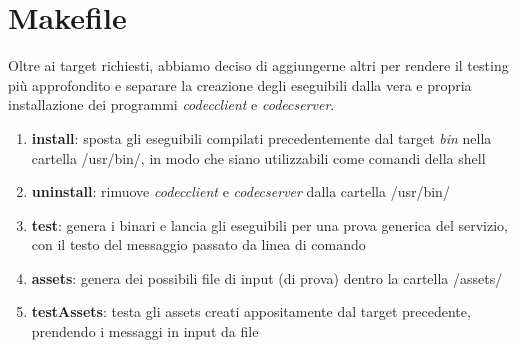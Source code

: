 \documentclass[a4paper,9pt]{article}
\begin{document}
\section{Makefile}
Oltre ai target richiesti, abbiamo deciso di aggiungerne altri per rendere il testing più approfondito e separare la creazione degli eseguibili dalla vera e propria installazione dei programmi \emph{codecclient} e \emph{codecserver}.
\begin{enumerate}
\item \textbf{install}: sposta gli eseguibili compilati precedentemente dal target \emph{bin} nella cartella /usr/bin/, in modo che siano utilizzabili come comandi della shell
\item \textbf{uninstall}: rimuove \emph{codecclient} e \emph{codecserver} dalla cartella /usr/bin/
\item \textbf{test}: genera i binari e lancia gli eseguibili per una prova generica del servizio, con il testo del messaggio passato da linea di comando
\item \textbf{assets}: genera dei possibili file di input (di prova) dentro la cartella /assets/
\item \textbf{testAssets}: testa gli assets creati appositamente dal target precedente, prendendo i messaggi in input da file 
\end{enumerate} 
\end{document}
